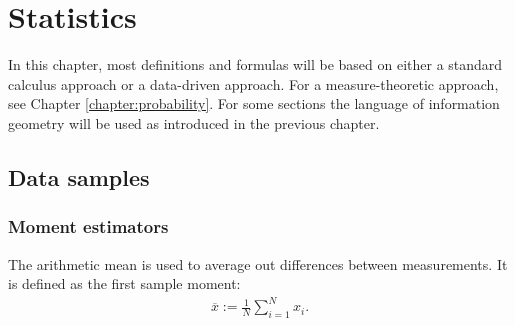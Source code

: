 \chapter{Statistics}\label{chapter:statistics}

    In this chapter, most definitions and formulas will be based on either a standard calculus approach or a data-driven approach. For a measure-theoretic approach, see Chapter \ref{chapter:probability}. For some sections the language of information geometry will be used as introduced in the previous chapter.

\section{Data samples}
\subsection{Moment estimators}

    \begin{example}\label{statistics:arithmetic_mean}
        The arithmetic mean is used to average out differences between measurements. It is defined as the first sample moment:
        \begin{gather}
            \overline{x} := \frac{1}{N}\sum_{i=1}^Nx_i.
        \end{gather}
    \end{example}

